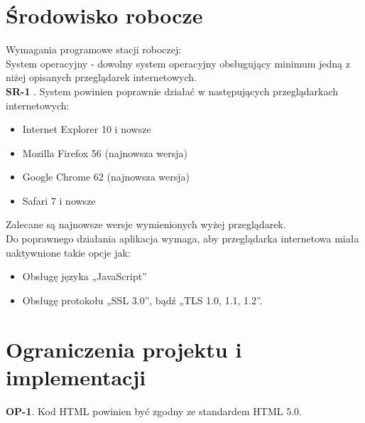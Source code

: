 \documentclass{scrreprt}
\begin{document}
\newpage
\section{ Środowisko robocze}
Wymagania programowe stacji roboczej:\\
System operacyjny - dowolny system operacyjny obsługujący minimum jedną z niżej opisanych przeglądarek internetowych.\\

\textbf{\textcolor{myBlue}{SR-1}} . System powinien poprawnie działać w następujących przeglądarkach internetowych:
\begin{itemize}[label={--}]
\item{Internet Explorer 10 i nowsze}
\item{Mozilla Firefox 56 (najnowsza wersja)}
\item{Google Chrome 62 (najnowsza wersja)}
\item{Safari 7 i nowsze}
\end{itemize}
Zalecane są najnowsze wersje wymienionych wyżej przeglądarek.\\

Do poprawnego działania aplikacja wymaga, aby przeglądarka internetowa miała uaktywnione takie opcje jak: 
\begin{itemize}[label={--}]
\item{Obsługę języka „JavaScript”}
\item{Obsługę protokołu „SSL 3.0”, bądź „TLS 1.0, 1.1, 1.2”.}
\end{itemize} 

\section{Ograniczenia projektu i implementacji} 
\textbf{\textcolor{myBlue}{OP-1}}. Kod HTML powinien być zgodny ze standardem HTML 5.0. \\
\end{document}
